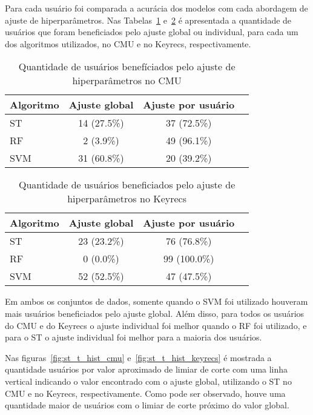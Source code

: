 Para cada usuário foi comparada a acurácia dos modelos com cada abordagem de ajuste de hiperparâmetros. Nas Tabelas~\ref{tab:cmu_hp_comparison} e~\ref{tab:keyrecs_hp_comparison} é apresentada a quantidade de usuários que foram beneficiados pelo ajuste global ou individual, para cada um dos algoritmos utilizados, no CMU e no Keyrecs, respectivamente. 

\begin{table}[htbp]
\centering
\caption{Quantidade de usuários benefíciados pelo ajuste de hiperparâmetros no CMU}
\label{tab:cmu_hp_comparison}
\begin{tabular}{|l|c|c|c|}
\hline
\textbf{Algoritmo} & \textbf{Ajuste global} & \textbf{Ajuste por usuário} \\
\hline
ST & 14 (27.5\%) & 37 (72.5\%) \\
\hline
RF & 2 (3.9\%) & 49 (96.1\%) \\
\hline
SVM & 31 (60.8\%) & 20 (39.2\%) \\
\hline
\end{tabular}
\end{table}

\begin{table}[htbp]
\centering
\caption{Quantidade de usuários beneficiados pelo ajuste de hiperparâmetros no Keyrecs}
\label{tab:keyrecs_hp_comparison}
\begin{tabular}{|l|c|c|c|}
\hline
\textbf{Algoritmo} & \textbf{Ajuste global} & \textbf{Ajuste por usuário} \\
\hline
ST & 23 (23.2\%) & 76 (76.8\%) \\
\hline
RF & 0 (0.0\%) & 99 (100.0\%) \\
\hline
SVM & 52 (52.5\%) & 47 (47.5\%) \\
\hline
\end{tabular}
\end{table}

Em ambos os conjuntos de dados, somente quando o SVM foi utilizado houveram mais usuários beneficiados pelo ajuste global. Além disso, para todos os usuários do CMU e do Keyrecs o ajuste individual foi melhor quando o RF foi utilizado, e para o ST o ajuste individual foi melhor para a maioria dos usuários.

Nas figuras~\ref{fig:st_t_hist_cmu} e~\ref{fig:st_t_hist_keyrecs} é mostrada a quantidade usuários por valor aproximado de limiar de corte com uma linha vertical indicando o valor encontrado com o ajuste global, utilizando o ST no CMU e no Keyrecs, respectivamente. Como pode ser observado, houve uma quantidade maior de usuários com o limiar de corte próximo do valor global.

